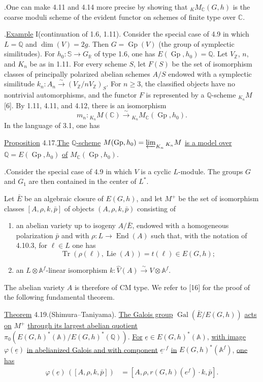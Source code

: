 \documentclass[10pt]{article}
\newcommand{\A}{\mathbb A}
\newcommand{\Af}{\mathbb A^f}
\newcommand{\C}{\mathbb C}
\newcommand{\Q}{\mathbb Q}
\newcommand{\R}{\mathbb R}
\newcommand{\Z}{\mathbb Z}
\newcommand{\bS}{\mathbb S}
\newcommand{\Gp}{\operatorname{Gp}}
\newcommand{\Lie}{\operatorname{Lie}}
\newcommand{\Gal}{\operatorname{Gal}}
\newcommand{\End}{\operatorname{End}}
\newcommand{\Tr}{\operatorname{Tr}}
\begin{document}
.\quad One can make 4.11 and 4.14 more precise by showing that ${}_K M_{\C}(G,h)$ is the coarse moduli scheme of the evident functor on schemes of finite type over $\C$.

.\quad \uline{Example} I\quad (continuation of 1.6, 1.11). Consider the special case of 4.9 in which $L=\Q$ and $\dim(V)=2g$. Then $G=\Gp(V)$ (the group of symplectic similitudes). For $h_0:\bS\longrightarrow G_\R$ of type 1.6, one has $E(\Gp,h_0)=\Q$. Let $V_\Z$, $n$, and $K_n$ be as in 1.11. For every scheme $S$, let $F(S)$ be the set of isomorphism classes of principally polarized abelian schemes $A/S$ endowed with a symplectic similitude $k_n:A_n\xrightarrow{\sim}(V_\Z/nV_\Z)_S$. For $n\geq3$, the classified objects have no nontrivial automorphisms, and the functor $F$ is represented by a $\Q$-scheme ${}_{K_n}M$ [6]. By 1.11, 4.11, and 4.12, there is an isomorphism
\[
m_n:{}_{K_n}M(\C)\xrightarrow{\sim}{}_{K_n}M_{\C}(\Gp,h_0).
\]
In the language of 3.1, one has

\noindent \uline{Proposition} 4.17.\quad \uline{The} \uline{$\Q$-scheme} $M(\Gp,h_0)=\varprojlim_{K_n}{}_{K_n}M$ \uline{is a model over} $\Q=E(\Gp,h_0)$ \uline{of} $M_{\C}(\Gp,h_0)$.

.\quad Consider the special case of 4.9 in which $V$ is a cyclic $L$-module. The groups $G$ and $G_1$ are then contained in the center of $L^*$.

Let $\bar E$ be an algebraic closure of $E(G,h)$, and let $M^+$ be the set of isomorphism classes
$[A,\rho,k,\bar p]$ of objects $(A,\rho,k,\bar p)$ consisting of
\begin{enumerate}[label=(\alph*)]
\item an abelian variety up to isogeny $A/\bar E$, endowed with a homogeneous polarization $\bar p$ and with $\rho:L\to\End(A)$ such that, with the notation of 4.10.3, for $\ell\in L$ one has
\[
\Tr(\rho(\ell),\Lie(A))=t(\ell)\in E(G,h);
\]
\item an $L\otimes\Af$-linear isomorphism $k:\widehat V(A)\xrightarrow{\sim}V\otimes\Af$.
\end{enumerate}
The abelian variety $A$ is therefore of CM type. We refer to [16] for the proof of the following fundamental theorem.

\noindent \uline{Theorem} 4.19.\quad (Shimura--Taniyama). \uline{The Galois group} $\Gal(\bar E/E(G,h))$ \uline{acts on} $M^+$ \uline{through its largest abelian quotient} $\pi_0(E(G,h)^*(\A)/E(G,h)^*(\Q))$. \uline{For} $\underline{e}\in E(G,h)^*(\A)$, \uline{with image} $\varphi(\underline{e})$ \uline{in abelianized Galois and with component} $\underline{e}^{,f}$ \uline{in} $E(G,h)^*(\Af)$, \uline{one has}
\begingroup
\makeatletter
\tagsleft@true
\makeatother
\begin{align}
\varphi(\underline{e})\,([A,\rho,k,\bar p])&=[A,\rho,r(G,h)(e^f)\cdot k,\bar p].\tag{4.19.1}
\end{align}
\endgroup
\end{document}
